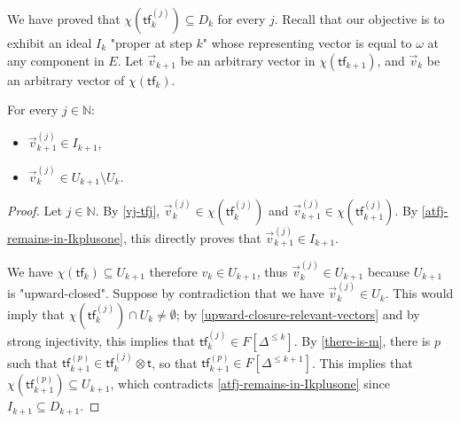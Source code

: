 \documentclass[10pt,a4paper]{article}
\let\mathbb\mathds
\renewcommand{\leq}{\leqslant}
\newcommand{\nats}{\mathbb{N}}
\newcommand{\transitions}{\Delta}
\newcommand*{\transfersof}[1]{F[#1]}
\newcommand*{\atf}{\mathsf{tf}}
\newcommand*{\tftimes}{\otimes}
\newcommand{\Tleq}[1]{\transfersof{\transitions^{\leq #1}}}
\newcommand*{\mapencoding}{\chi}
\newcommand*{\tftrans}{\mathsf{t}}
\begin{document}
\begin{appendixproof}
	We have proved that \(\mapencoding(\atf_k^{(j)}) \subseteq D_k\) for every \(j\).
	Recall that our objective is to exhibit an ideal \(I_k\) "proper at step \(k\)" whose representing vector is equal to \(\omega\) at any component in \(E\).
	Let \(\vec{v}_{k+1}\) be an arbitrary vector in \(\mapencoding(\atf_{k+1})\), and \(\vec{v}_k\) be an arbitrary vector of \(\mapencoding(\atf_k)\).

	\begin{lemma}
		\label{vk-vkplusone-sets} For every \(j \in \nats\):
		\begin{itemize}[noitemsep,topsep=0pt,parsep=0pt,partopsep=0pt]
			\item \(\vec{v}_{k+1}^{(j)} \in I_{k+1}\),
			\item \(\vec{v}_k^{(j)} \in U_{k+1} \setminus U_k\).
		\end{itemize}
	\end{lemma}
	\begin{proof}
		Let \(j \in \nats\).
		By \cref{vj-tfj}, \(\vec{v}_k^{(j)} \in \mapencoding(\atf_k^{(j)})\) and \(\vec{v}_{k+1}^{(j)} \in \mapencoding(\atf_{k+1}^{(j)})\).
		By \cref{atfj-remains-in-Ikplusone}, this directly proves that \(\vec{v}_{k+1}^{(j)} \in I_{k+1}\).

		We have \(\mapencoding(\atf_k) \subseteq U_{k+1}\) therefore \(v_k \in U_{k+1}\), thus \(\vec{v}_{k}^{(j)} \in U_{k+1}\) because \(U_{k+1}\) is "upward-closed".
		Suppose by contradiction that we have \(\vec{v}_{k}^{(j)} \in U_k\).
		This would imply that \(\mapencoding(\atf_k^{(j)}) \cap U_k \ne \emptyset\); by \cref{upward-closure-relevant-vectors} and by strong injectivity, this implies that \(\atf_k^{(j)} \in \Tleq{k}\).
		By \cref{there-is-m}, there is \(p\) such that \(\atf_{k+1}^{(p)} \in \atf_k^{(j)} \tftimes \tftrans\), so that \(\atf_{k+1}^{(p)} \in \Tleq{k+1}\).
		This implies that \(\mapencoding(\atf_{k+1}^{(p)}) \subseteq U_{k+1}\), which contradicts \cref{atfj-remains-in-Ikplusone} since \(I_{k+1}\subseteq D_{k+1}\).
	\end{proof}


\end{appendixproof}
\end{document}

